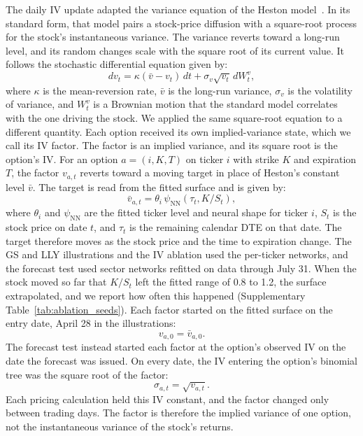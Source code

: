 The daily IV update adapted the variance equation of the Heston model~\cite{heston1993}. In its standard form, that model pairs a stock-price diffusion with a square-root process for the stock's instantaneous variance. The variance reverts toward a long-run level, and its random changes scale with the square root of its current value. It follows the stochastic differential equation given by:
\begin{equation}\label{eq:heston_standard}
    dv_t = \kappa(\bar v-v_t)\,dt + \sigma_v\sqrt{v_t}\,dW_t^v ,
\end{equation}
where $\kappa$ is the mean-reversion rate, $\bar v$ is the long-run variance, $\sigma_v$ is the volatility of variance, and $W_t^v$ is a Brownian motion that the standard model correlates with the one driving the stock. We applied the same square-root equation to a different quantity. Each option received its own implied-variance state, which we call its IV factor. The factor is an implied variance, and its square root is the option's IV. For an option $a=(i,K,T)$ on ticker $i$ with strike $K$ and expiration $T$, the factor $v_{a,t}$ reverts toward a moving target in place of Heston's constant level $\bar v$. The target is read from the fitted surface and is given by:
\begin{equation}\label{eq:theta}
    \bar v_{a,t}=\theta_i\,
    \psi_{\mathrm{NN}}\!\left(\tau_t,K/S_t\right),
\end{equation}
where $\theta_i$ and $\psi_{\mathrm{NN}}$ are the fitted ticker level and neural shape for ticker $i$, $S_t$ is the stock price on date $t$, and $\tau_t$ is the remaining calendar DTE on that date. The target therefore moves as the stock price and the time to expiration change. The GS and LLY illustrations and the IV ablation used the per-ticker networks, and the forecast test used sector networks refitted on data through July 31. When the stock moved so far that $K/S_t$ left the fitted range of 0.8 to 1.2, the surface extrapolated, and we report how often this happened (Supplementary Table~\ref{tab:ablation_seeds}). Each factor started on the fitted surface on the entry date, April 28 in the illustrations:
\begin{equation}\label{eq:v0}
    v_{a,0}=\bar v_{a,0}.
\end{equation}
The forecast test instead started each factor at the option's observed IV on the date the forecast was issued. On every date, the IV entering the option's binomial tree was the square root of the factor:
\begin{equation}\label{eq:sigma_path}
    \sigma_{a,t}=\sqrt{v_{a,t}}.
\end{equation}
Each pricing calculation held this IV constant, and the factor changed only between trading days. The factor is therefore the implied variance of one option, not the instantaneous variance of the stock's returns.

